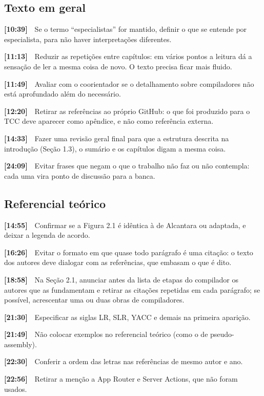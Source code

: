 \documentclass[11pt,a4paper]{article}
\newcommand{\tm}[1]{\textbf{[#1]}\ \ }
\begin{document}
\subsection*{Texto em geral}
\begin{checklist}
  \item \tm{10:39}Se o termo “especialistas” for mantido, definir o que se entende por especialista, para não haver interpretações diferentes.
  \item \tm{11:13}Reduzir as repetições entre capítulos: em vários pontos a leitura dá a sensação de ler a mesma coisa de novo. O texto precisa ficar mais fluido.
  \item \tm{11:49}Avaliar com o coorientador se o detalhamento sobre compiladores não está aprofundado além do necessário.
  \item \tm{12:20}Retirar as referências ao próprio GitHub: o que foi produzido para o TCC deve aparecer como apêndice, e não como referência externa.
  \item \tm{14:33}Fazer uma revisão geral final para que a estrutura descrita na introdução (Seção 1.3), o sumário e os capítulos digam a mesma coisa.
  \item \tm{24:09}Evitar frases que negam o que o trabalho não faz ou não contempla: cada uma vira ponto de discussão para a banca.
\end{checklist}
\subsection*{Referencial teórico}
\begin{checklist}
  \item \tm{14:55}Confirmar se a Figura 2.1 é idêntica à de Alcantara ou adaptada, e deixar a legenda de acordo.
  \item \tm{16:26}Evitar o formato em que quase todo parágrafo é uma citação: o texto dos autores deve dialogar com as referências, que embasam o que é dito.
  \item \tm{18:58}Na Seção 2.1, anunciar antes da lista de etapas do compilador os autores que as fundamentam e retirar as citações repetidas em cada parágrafo; se possível, acrescentar uma ou duas obras de compiladores.
  \item \tm{21:30}Especificar as siglas LR, SLR, YACC e demais na primeira aparição.
  \item \tm{21:49}Não colocar exemplos no referencial teórico (como o de pseudo-assembly).
  \item \tm{22:30}Conferir a ordem das letras nas referências de mesmo autor e ano.
  \item \tm{22:56}Retirar a menção a App Router e Server Actions, que não foram usados.
\end{checklist}
\end{document}
